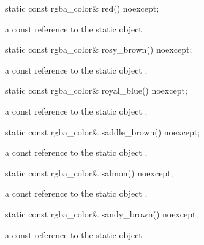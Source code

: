 \begin{itemdecl}
static const rgba_color& red() noexcept;
\end{itemdecl}
\begin{itemdescr}
\pnum
\returns
a const reference to the static  object .
\end{itemdescr}

\begin{itemdecl}
static const rgba_color& rosy_brown() noexcept;
\end{itemdecl}
\begin{itemdescr}
\pnum
\returns
a const reference to the static  object .
\end{itemdescr}

\begin{itemdecl}
static const rgba_color& royal_blue() noexcept;
\end{itemdecl}
\begin{itemdescr}
\pnum
\returns
a const reference to the static  object .
\end{itemdescr}

\begin{itemdecl}
static const rgba_color& saddle_brown() noexcept;
\end{itemdecl}
\begin{itemdescr}
\pnum
\returns
a const reference to the static  object .
\end{itemdescr}

\begin{itemdecl}
static const rgba_color& salmon() noexcept;
\end{itemdecl}
\begin{itemdescr}
\pnum
\returns
a const reference to the static  object .
\end{itemdescr}

\begin{itemdecl}
static const rgba_color& sandy_brown() noexcept;
\end{itemdecl}
\begin{itemdescr}
\pnum
\returns
a const reference to the static  object .
\end{itemdescr}

